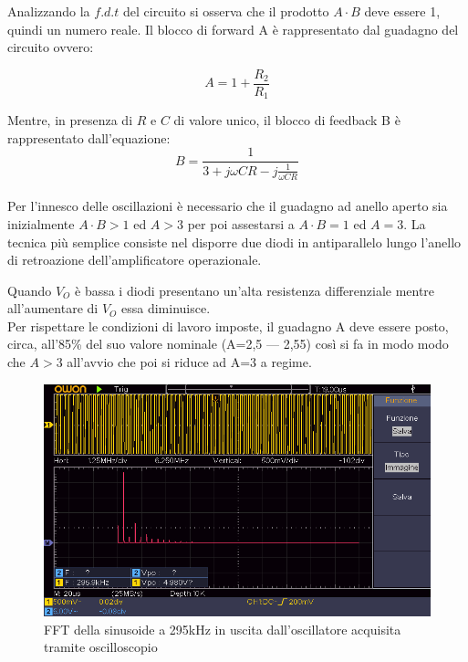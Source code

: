 \documentclass[titlepage]{report}
\begin{document}
	\noindent Analizzando la $f.d.t$ del circuito si osserva che il prodotto $A\cdot B$ deve essere 1, quindi un numero reale.
	Il blocco di forward A è rappresentato dal guadagno del circuito ovvero: 

	\begin{equation}
		\label{eq:LF356_Gain}
		A = 1 + \frac{R_2}{R_1}
	\end{equation}


	Mentre, in presenza di $R$ e $C$ di valore unico, il blocco di feedback B è rappresentato dall'equazione:
	\\
	\begin{equation}
		\label{eq:LF356_Feedback}
		B = \frac{1}{3 + j\omega C R - j\frac{1}{\omega C R}}
	\end{equation}
	\\
	Per l'innesco delle oscillazioni è necessario che il guadagno ad anello aperto sia inizialmente $A\cdot B>1$ ed $A>3$ per poi assestarsi a $A\cdot B=1$ ed $A=3$. La tecnica più semplice consiste nel disporre due diodi in antiparallelo lungo l'anello di retroazione dell'amplificatore operazionale.
	
	\noindent Quando \textit{$V_{O}$} è bassa i diodi presentano un'alta resistenza differenziale mentre all'aumentare di \textit{$V_{O}$} essa diminuisce. 
	\\ Per rispettare le condizioni di lavoro imposte, il guadagno A deve essere posto, circa, all'85\% del suo valore nominale (A=2,5 — 2,55) così si fa in modo modo che $A>3$ all'avvio che poi si riduce ad A=3 a regime.

	\begin{figure}[H]
		\centering
		\includegraphics[scale=0.9]{Immagini/009_OscillatoreWienFFT.png}
		\caption{FFT della sinusoide a 295kHz in uscita dall'oscillatore acquisita tramite oscilloscopio}
		\label{fig:FFT295k}
	\end{figure}
	
\end{document}
